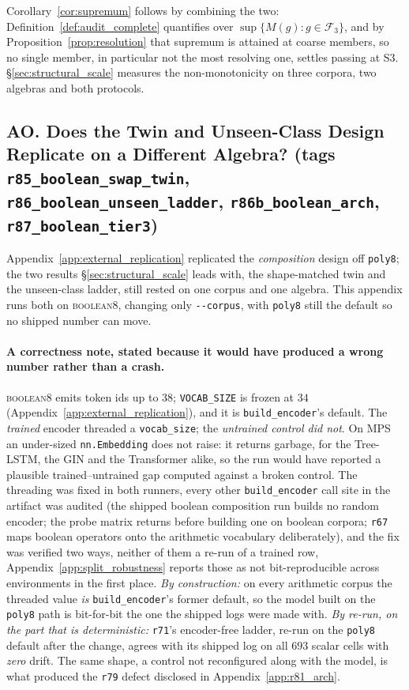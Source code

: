 \noindent Corollary~\ref{cor:supremum} follows by combining the two: Definition~\ref{def:audit_complete} quantifies over $\sup\{M(g):g\in\mathcal{F}_3\}$, and by Proposition~\ref{prop:resolution} that supremum is attained at coarse members, so no single member, in particular not the most resolving one, settles passing at S3. \S\ref{sec:structural_scale} measures the non-monotonicity on three corpora, two algebras and both protocols.

\subsection*{AO. Does the Twin and Unseen-Class Design Replicate on a Different Algebra? (tags \texttt{r85\_boolean\_swap\_twin}, \texttt{r86\_boolean\_unseen\_ladder}, \texttt{r86b\_boolean\_arch}, \texttt{r87\_boolean\_tier3})}

Appendix~\ref{app:external_replication} replicated the \emph{composition} design off \texttt{poly8}; the two results \S\ref{sec:structural_scale} leads with, the shape-matched twin and the unseen-class ladder, still rested on one corpus and one algebra. This appendix runs both on \textsc{boolean8}, changing only \texttt{-{}-corpus}, with \texttt{poly8} still the default so no shipped number can move.

\paragraph{A correctness note, stated because it would have produced a wrong number rather than a crash.} \textsc{boolean8} emits token ids up to $38$; \texttt{VOCAB\_SIZE} is frozen at $34$ (Appendix~\ref{app:external_replication}), and it is \texttt{build\_encoder}'s default. The \emph{trained} encoder threaded a \texttt{vocab\_size}; the \emph{untrained control did not}. On MPS an under-sized \texttt{nn.Embedding} does not raise: it returns garbage, for the Tree-LSTM, the GIN and the Transformer alike, so the run would have reported a plausible trained--untrained gap computed against a broken control. The threading was fixed in both runners, every other \texttt{build\_encoder} call site in the artifact was audited (the shipped boolean composition run builds no random encoder; the probe matrix returns before building one on boolean corpora; \texttt{r67} maps boolean operators onto the arithmetic vocabulary deliberately), and the fix was verified two ways, neither of them a re-run of a trained row, Appendix~\ref{app:split_robustness} reports those as not bit-reproducible across environments in the first place. \emph{By construction:} on every arithmetic corpus the threaded value \emph{is} \texttt{build\_encoder}'s former default, so the model built on the \texttt{poly8} path is bit-for-bit the one the shipped logs were made with. \emph{By re-run, on the part that is deterministic:} \texttt{r71}'s encoder-free ladder, re-run on the \texttt{poly8} default after the change, agrees with its shipped log on all $693$ scalar cells with \emph{zero} drift. The same shape, a control not reconfigured along with the model, is what produced the \texttt{r79} defect disclosed in Appendix~\ref{app:r81_arch}.

